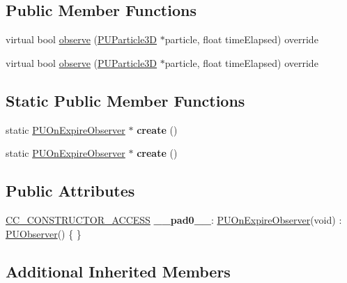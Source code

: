 \subsection*{Public Member Functions}
\begin{DoxyCompactItemize}
\item 
virtual bool \hyperlink{classPUOnExpireObserver_aaaddff7c0cc6987a1f341437167729af}{observe} (\hyperlink{structPUParticle3D}{P\+U\+Particle3D} $\ast$particle, float time\+Elapsed) override
\item 
virtual bool \hyperlink{classPUOnExpireObserver_ad14849989e86b0d3c24bfab468149b9d}{observe} (\hyperlink{structPUParticle3D}{P\+U\+Particle3D} $\ast$particle, float time\+Elapsed) override
\end{DoxyCompactItemize}
\subsection*{Static Public Member Functions}
\begin{DoxyCompactItemize}
\item 
\mbox{\label{classPUOnExpireObserver_aae667889e6e0c927a343ab1e26833a40}} 
static \hyperlink{classPUOnExpireObserver}{P\+U\+On\+Expire\+Observer} $\ast$ {\bfseries create} ()
\item 
\mbox{\label{classPUOnExpireObserver_ae6c5fb87ef87100ca9201a3fdf0fa3d4}} 
static \hyperlink{classPUOnExpireObserver}{P\+U\+On\+Expire\+Observer} $\ast$ {\bfseries create} ()
\end{DoxyCompactItemize}
\subsection*{Public Attributes}
\begin{DoxyCompactItemize}
\item 
\mbox{\label{classPUOnExpireObserver_aebfa7656b450142380ffb1e2100520ba}} 
\hyperlink{_2cocos2d_2cocos_2base_2ccConfig_8h_a25ef1314f97c35a2ed3d029b0ead6da0}{C\+C\+\_\+\+C\+O\+N\+S\+T\+R\+U\+C\+T\+O\+R\+\_\+\+A\+C\+C\+E\+SS} {\bfseries \+\_\+\+\_\+pad0\+\_\+\+\_\+}\+: \hyperlink{classPUOnExpireObserver}{P\+U\+On\+Expire\+Observer}(void) \+: \hyperlink{classPUObserver}{P\+U\+Observer}() \{ \}
\end{DoxyCompactItemize}
\subsection*{Additional Inherited Members}


